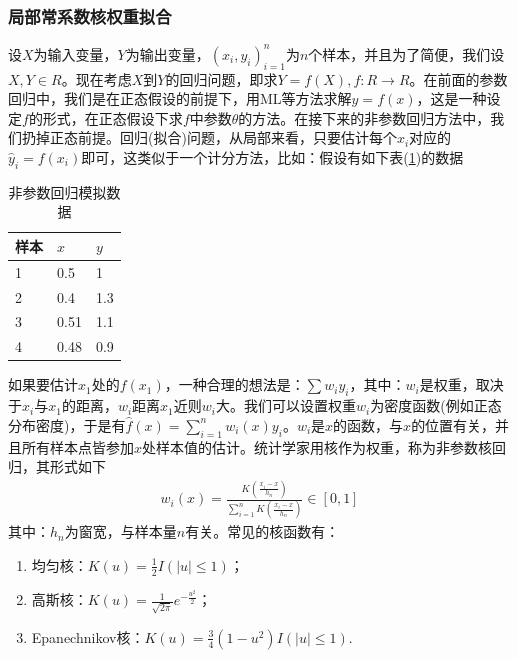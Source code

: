         \subsubsection{局部常系数核权重拟合}
            \par
            设$X$为输入变量，$Y$为输出变量，$(x_i,y_i)_{i=1}^n$为$n$个样本，并且为了简便，我们设$X,Y\in R$。现在考虑$X$到$Y$的回归问题，即求$Y=f(X),f:R\to R$。在前面的参数回归中，我们是在正态假设的前提下，用ML等方法求解$y = f(x)$，这是一种设定$f$的形式，在正态假设下求$f$中参数$\theta$的方法。在接下来的非参数回归方法中，我们扔掉正态前提。回归(拟合)问题，从局部来看，只要估计每个$x_i$对应的$\hat{y}_i=f(x_i)$即可，这类似于一个计分方法，比如：假设有如下表(\ref{tab:非参数回归模拟数据})的数据
            \begin{table}[H]
              \caption{非参数回归模拟数据}
              \label{tab:非参数回归模拟数据}
              \centering
              \begin{tabular}{l|ll}
              \toprule
              样本   & $x$    & $y$ \\
              \midrule
              1      & 0.5    & 1   \\
              2      & 0.4    & 1.3 \\
              3      & 0.51   & 1.1 \\
              4      & 0.48   & 0.9 \\
              \bottomrule
              \end{tabular}
            \end{table}
            如果要估计$x_1$处的$f(x_1)$，一种合理的想法是：$\sum w_i y_i$，其中：$w_i$是权重，取决于$x_i$与$x_1$的距离，$w_i$距离$x_1$近则$w_i$大。我们可以设置权重$w_i$为密度函数(例如正态分布密度)，于是有$\hat{f}(x) = \sum_{i=1}^nw_i(x)y_i$。$w_i$是$x$的函数，与$x$的位置有关，并且所有样本点皆参加$x$处样本值的估计。统计学家用核作为权重，称为非参数核回归，其形式如下
            \begin{align*}
            w_i(x) = \frac{K \left( \frac{x_i - x}{h_n} \right)  }{\sum\limits_{i=1}^nK \left( \frac{x_i - x}{h_n} \right)} \in [0,1]
            \end{align*}
            其中：$h_n$为窗宽，与样本量$n$有关。常见的核函数有：
            \begin{enumerate}
            \item 均匀核：$K(u) = \frac{1}{2}I(|u| \leqslant 1)$；
            \item 高斯核：$K(u) = \frac{1}{\sqrt{2\pi}}e^{-\frac{u^2}{2}}$；
            \item Epanechnikov核：$K(u) = \frac{3}{4}(1-u^2)I(|u| \leqslant 1)$.
            \end{enumerate}

